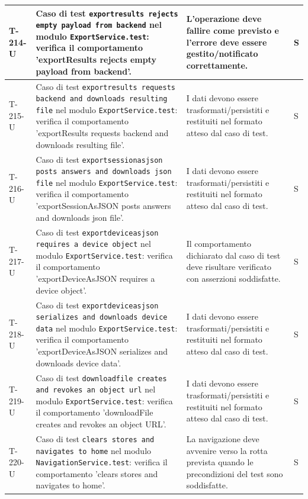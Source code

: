 \documentclass[a4paper,12pt]{article}
\begin{document}
{{\begin{longtable}{|>{\RaggedRight\arraybackslash}p{1.55cm}|>{\RaggedRight\arraybackslash}p{8.0cm}|>{\RaggedRight\arraybackslash}p{4.6cm}|>{\RaggedRight\arraybackslash}p{1.2cm}|}
        \hline
        T-214-U & Caso di test \texttt{exportresults rejects empty payload from backend} nel modulo \texttt{ExportService.test}: verifica il comportamento 'exportResults rejects empty payload from backend'. & L'operazione deve fallire come previsto e l'errore deve essere gestito/notificato correttamente. & S \\
        \hline
        T-215-U & Caso di test \texttt{exportresults requests backend and downloads resulting file} nel modulo \texttt{ExportService.test}: verifica il comportamento 'exportResults requests backend and downloads resulting file'. & I dati devono essere trasformati/persistiti e restituiti nel formato atteso dal caso di test. & S \\
        \hline
        T-216-U & Caso di test \texttt{exportsessionasjson posts answers and downloads json file} nel modulo \texttt{ExportService.test}: verifica il comportamento 'exportSessionAsJSON posts answers and downloads json file'. & I dati devono essere trasformati/persistiti e restituiti nel formato atteso dal caso di test. & S \\
        \hline
        T-217-U & Caso di test \texttt{exportdeviceasjson requires a device object} nel modulo \texttt{ExportService.test}: verifica il comportamento 'exportDeviceAsJSON requires a device object'. & Il comportamento dichiarato dal caso di test deve risultare verificato con asserzioni soddisfatte. & S \\
        \hline
        T-218-U & Caso di test \texttt{exportdeviceasjson serializes and downloads device data} nel modulo \texttt{ExportService.test}: verifica il comportamento 'exportDeviceAsJSON serializes and downloads device data'. & I dati devono essere trasformati/persistiti e restituiti nel formato atteso dal caso di test. & S \\
        \hline
        T-219-U & Caso di test \texttt{downloadfile creates and revokes an object url} nel modulo \texttt{ExportService.test}: verifica il comportamento 'downloadFile creates and revokes an object URL'. & I dati devono essere trasformati/persistiti e restituiti nel formato atteso dal caso di test. & S \\
        \hline
        T-220-U & Caso di test \texttt{clears stores and navigates to home} nel modulo \texttt{NavigationService.test}: verifica il comportamento 'clears stores and navigates to home'. & La navigazione deve avvenire verso la rotta prevista quando le precondizioni del test sono soddisfatte. & S \\
        \hline

\end{longtable}}}
\end{document}
